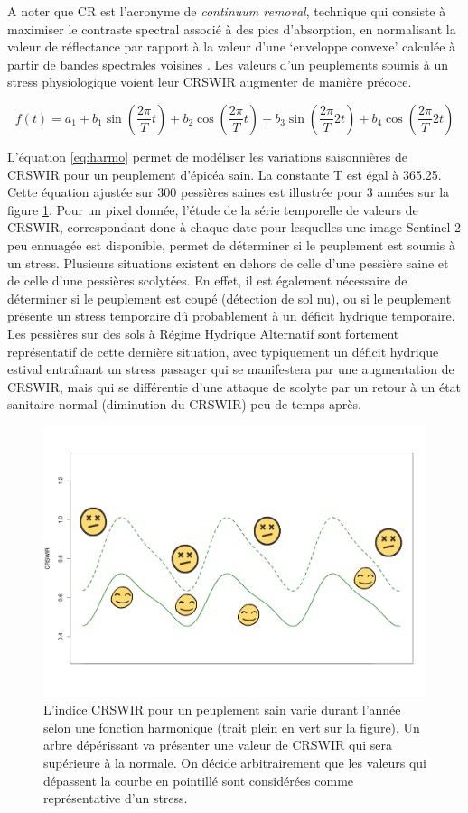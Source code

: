 \documentclass[a4paper, 12pt]{article} %
\begin{document}
A noter que CR est l'acronyme de \textit{continuum removal}, technique qui consiste à maximiser le contraste spectral associé à des pics d’absorption, en normalisant la valeur de réflectance
par rapport à la valeur d’une ‘enveloppe convexe’ calculée à partir de bandes spectrales voisines \citep{dutrieux_mise_2021}.
Les valeurs d'un peuplements soumis à un stress physiologique voient leur CRSWIR augmenter de manière précoce.

\begin{equation}\label{eq:harmo}
 f(t) =   a_{1} + b_{1} \sin(\dfrac{2\pi}{T}t)+ b_{2} \cos(\dfrac{2\pi}{T}t)+ b_{3} \sin(\dfrac{2\pi}{T}2t)+ b_{4} \cos(\dfrac{2\pi}{T}2t)
\end{equation} 

L'équation \ref{eq:harmo} permet de modéliser les variations saisonnières de CRSWIR pour un peuplement d'épicéa sain. La constante T est égal à 365.25. Cette équation ajustée sur 300 pessières saines est illustrée pour 3 années sur la figure \ref{fig:harmo}. Pour un pixel donnée, l'étude de la série temporelle de valeurs de CRSWIR, correspondant donc à chaque date pour lesquelles une image Sentinel-2 peu ennuagée est disponible, permet de déterminer si le peuplement est soumis à un stress. Plusieurs situations existent en dehors de celle d'une pessière saine et de celle d'une pessières scolytées. En effet, il est également nécessaire de déterminer si le peuplement est coupé (détection de sol nu), ou si le peuplement présente un stress temporaire dû probablement à un déficit hydrique temporaire. Les pessières sur des sols à Régime Hydrique Alternatif sont fortement représentatif de cette dernière situation, avec typiquement un déficit hydrique estival entraînant un stress passager qui se manifestera par une augmentation de CRSWIR, mais qui se différentie d'une attaque de scolyte par un retour à un état sanitaire normal (diminution du CRSWIR) peu de temps après.

\begin{figure}[H]
	\centering
	\includegraphics[width=0.9\linewidth]{fctHarmo.png}
	\caption{L'indice CRSWIR pour un peuplement sain varie durant l'année selon une fonction harmonique (trait plein en vert sur la figure). Un arbre dépérissant va présenter une valeur de CRSWIR qui sera supérieure à la normale. On décide arbitrairement que les valeurs qui dépassent la courbe en pointillé sont considérées comme représentative d'un stress. }
	\label{fig:harmo}
\end{figure}
\end{document}
